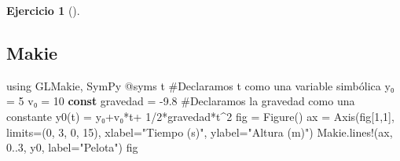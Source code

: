 \documentclass[
  a4paper,
]{scrreport}
\newenvironment{Shaded}{\begin{snugshade}}{\end{snugshade}}
\newcommand{\BuiltInTok}[1]{\textcolor[rgb]{0.00,0.23,0.31}{#1}}
\newcommand{\CommentTok}[1]{\textcolor[rgb]{0.37,0.37,0.37}{#1}}
\newcommand{\FloatTok}[1]{\textcolor[rgb]{0.68,0.00,0.00}{#1}}
\newcommand{\FunctionTok}[1]{\textcolor[rgb]{0.28,0.35,0.67}{#1}}
\newcommand{\ImportTok}[1]{\textcolor[rgb]{0.00,0.46,0.62}{#1}}
\newcommand{\KeywordTok}[1]{\textcolor[rgb]{0.00,0.23,0.31}{\textbf{#1}}}
\newcommand{\NormalTok}[1]{\textcolor[rgb]{0.00,0.23,0.31}{#1}}
\newcommand{\OperatorTok}[1]{\textcolor[rgb]{0.37,0.37,0.37}{#1}}
\newcommand{\PreprocessorTok}[1]{\textcolor[rgb]{0.68,0.00,0.00}{#1}}
\newcommand{\StringTok}[1]{\textcolor[rgb]{0.13,0.47,0.30}{#1}}
\theoremstyle{definition}
\newtheorem{exercise}{Ejercicio}[chapter]
\theoremstyle{remark}
\begin{document}
\begin{exercise}[]
\begin{enumerate}
\begin{tcolorbox}
  \end{tcolorbox}

  \begin{tcolorbox}[enhanced jigsaw, bottomtitle=1mm, rightrule=.15mm, left=2mm, colback=white, title=\textcolor{quarto-callout-tip-color}{\faLightbulb}\hspace{0.5em}{Solución}, bottomrule=.15mm, colframe=quarto-callout-tip-color-frame, toprule=.15mm, leftrule=.75mm, opacityback=0, coltitle=black, breakable, colbacktitle=quarto-callout-tip-color!10!white, arc=.35mm, toptitle=1mm, titlerule=0mm, opacitybacktitle=0.6]

  \section{Makie}

\begin{Shaded}
\begin{Highlighting}[]
\ImportTok{using} \BuiltInTok{GLMakie}\NormalTok{, }\BuiltInTok{SymPy}
\PreprocessorTok{@syms}\NormalTok{ t  }\CommentTok{\#Declaramos t como una variable simbólica}
\NormalTok{y₀ }\OperatorTok{=} \FloatTok{5}
\NormalTok{v₀ }\OperatorTok{=} \FloatTok{10}
\KeywordTok{const}\NormalTok{ gravedad }\OperatorTok{=} \OperatorTok{{-}}\FloatTok{9.8}  \CommentTok{\#Declaramos la gravedad como una constante}
\FunctionTok{y0}\NormalTok{(t) }\OperatorTok{=}\NormalTok{ y₀}\OperatorTok{+}\NormalTok{v₀}\OperatorTok{*}\NormalTok{t}\OperatorTok{+} \FloatTok{1}\OperatorTok{/}\FloatTok{2}\OperatorTok{*}\NormalTok{gravedad}\OperatorTok{*}\NormalTok{t}\OperatorTok{\^{}}\FloatTok{2}
\NormalTok{fig }\OperatorTok{=} \FunctionTok{Figure}\NormalTok{()}
\NormalTok{ax }\OperatorTok{=} \FunctionTok{Axis}\NormalTok{(fig[}\FloatTok{1}\NormalTok{,}\FloatTok{1}\NormalTok{], limits}\OperatorTok{=}\NormalTok{(}\FloatTok{0}\NormalTok{, }\FloatTok{3}\NormalTok{, }\FloatTok{0}\NormalTok{, }\FloatTok{15}\NormalTok{), xlabel}\OperatorTok{=}\StringTok{"Tiempo (s)"}\NormalTok{, ylabel}\OperatorTok{=}\StringTok{"Altura (m)"}\NormalTok{)}
\NormalTok{Makie.}\FunctionTok{lines!}\NormalTok{(ax, }\FloatTok{0}\OperatorTok{..}\FloatTok{3}\NormalTok{, y0, label}\OperatorTok{=}\StringTok{"Pelota"}\NormalTok{)}
\NormalTok{fig}
\end{Highlighting}
\end{Shaded}


\end{tcolorbox}
\end{enumerate}
\end{exercise}
\end{document}
